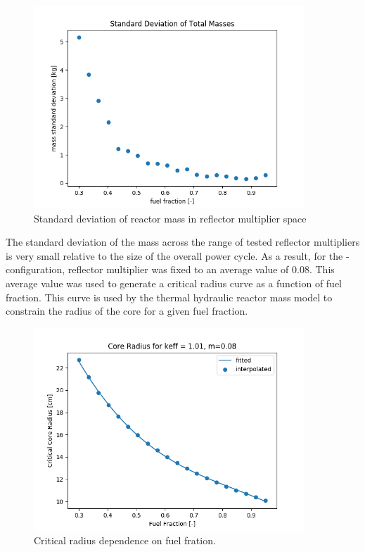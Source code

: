 \begin{figure}[h]
    \centering
    \includegraphics[width=4in]{../images/mass_std_uo2_co2.png}
\caption{Standard deviation of reactor mass in reflector multiplier space}
\label{fig:mass_std_co2_uo2}
\end{figure}

The standard deviation of the mass across the range of tested reflector
multipliers is very small relative to the size of the overall power cycle. As a
result, for the \uox-\codiox configuration, reflector multiplier was fixed to an
average value of 0.08. This average value was used to generate a critical radius
curve as a function of fuel fraction. This curve is used by the thermal
hydraulic reactor mass model to constrain the radius of the core for a given
fuel fraction. 

\begin{figure}[h]
    \centering
    \includegraphics[width=4in]{../images/uo2_co2_core_r.png}
\caption{Critical radius dependence on fuel fration.}
\label{fig:core_r_co2_uo2}
\end{figure}


